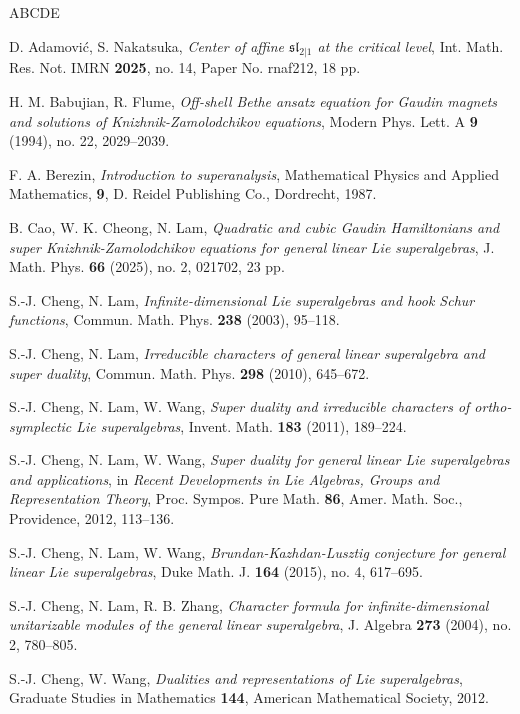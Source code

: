 \documentclass[11pt, reqno]{amsart}
\theoremstyle{definition}
\theoremstyle{remark}
\numberwithin{equation}{section}
\begin{document}
\begin{thebibliography}{ABCDE}

 D. Adamovi\'c, S. Nakatsuka, \emph{Center of affine $\mathfrak{sl}_{2|1}$ at the critical level}, Int. Math. Res. Not. IMRN \textbf{2025}, no. 14, Paper No. rnaf212, 18 pp.

 H. M. Babujian, R. Flume, \emph{Off-shell Bethe ansatz equation for Gaudin magnets and solutions of Knizhnik-Zamolodchikov equations}, Modern Phys. Lett. A \textbf{9} (1994), no. 22, 2029--2039.

 F. A. Berezin, \emph{Introduction to superanalysis}, Mathematical Physics and Applied Mathematics, \textbf{9}, D. Reidel Publishing Co., Dordrecht, 1987.

 B. Cao, W. K. Cheong, N. Lam, \emph{Quadratic and cubic Gaudin Hamiltonians and super Knizhnik-Zamolodchikov equations for general linear Lie superalgebras}, J. Math. Phys. \textbf{66} (2025), no. 2, 021702, 23 pp.

 S.-J. Cheng, N. Lam, \emph{ Infinite-dimensional Lie superalgebras and hook Schur functions}, Commun. Math. Phys. \textbf{238} (2003), 95--118.

 S.-J. Cheng, N. Lam, \emph{Irreducible characters of general linear superalgebra and super duality}, Commun. Math. Phys. \textbf{298} (2010), 645--672.

 S.-J. Cheng, N. Lam, W. Wang, \emph{Super duality and irreducible characters of ortho-symplectic Lie superalgebras}, Invent. Math. \textbf{183} (2011), 189--224.

 S.-J. Cheng, N. Lam, W. Wang, \emph{ Super duality for general linear Lie superalgebras and applications}, in \emph{Recent Developments in Lie Algebras, Groups and Representation Theory}, Proc. Sympos. Pure Math. \textbf{86}, Amer. Math. Soc., Providence, 2012, 113--136.

 S.-J. Cheng, N. Lam, W. Wang, \emph{Brundan-Kazhdan-Lusztig conjecture for general linear Lie superalgebras}, Duke Math. J. \textbf{164} (2015), no. 4, 617--695.

 S.-J. Cheng, N. Lam, R. B. Zhang, \emph{Character formula for infinite-dimensional unitarizable modules of the general linear superalgebra}, J. Algebra \textbf{273} (2004), no. 2, 780--805.

 S.-J. Cheng, W. Wang, \emph{Dualities and representations of Lie superalgebras}, Graduate Studies in Mathematics \textbf{144}, American Mathematical Society, 2012.


\end{thebibliography}
\end{document}
